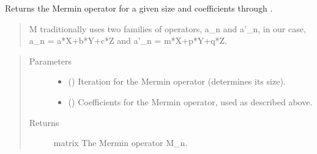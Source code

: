 \documentclass[letterpaper,10pt,english]{sphinxmanual}
\begin{document}

\begin{fulllineitems}
\label{\detokenize{mermin_eval:mermin_eval.M_from_coef}}
Returns the Mermin operator for a given size  and coefficients  
through .
\begin{quote}

M traditionally uses two families of operators, a\_n and a’\_n, in our 
case, a\_n = a*X+b*Y+c*Z and a’\_n = m*X+p*Y+q*Z.
\end{quote}
\begin{quote}\begin{description}
\item[{Parameters}] \leavevmode\begin{itemize}
\item {} 
 () \textendash{} Iteration for the Mermin operator (determines its size).

\item {} 
\sphinxstyleliteralstrong{\sphinxupquote{,}}\sphinxstyleliteralstrong{\sphinxupquote{,}}\sphinxstyleliteralstrong{\sphinxupquote{,}}\sphinxstyleliteralstrong{\sphinxupquote{,}}\sphinxstyleliteralstrong{\sphinxupquote{,}} () \textendash{} Coefficients for the Mermin operator, used as described 
above.

\end{itemize}

\item[{Returns}] \leavevmode
matrix \textendash{} The Mermin operator M\_n.

\end{description}\end{quote}

\end{fulllineitems}

\end{document}
